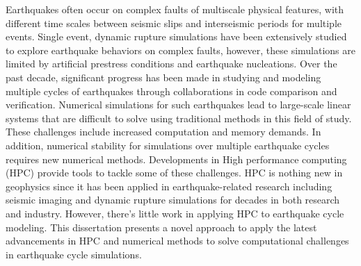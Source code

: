 Earthquakes often occur on complex faults of multiscale physical features, with different time scales between seismic slips and interseismic periods for multiple events.
Single event, dynamic rupture simulations have been extensively studied to explore earthquake behaviors on complex faults, however, these simulations are limited by artificial prestress conditions and earthquake nucleations.
Over the past decade, significant progress has been made in studying and modeling multiple cycles of earthquakes through collaborations in code comparison and verification.
Numerical simulations for such earthquakes lead to large-scale linear systems that are difficult to solve using traditional methods in this field of study.
These challenges include increased computation and memory demands.
In addition, numerical stability for simulations over multiple earthquake cycles requires new numerical methods.
Developments in High performance computing (HPC) provide tools to tackle some of these challenges.
HPC is nothing new in geophysics since it has been applied in earthquake-related research including seismic imaging and dynamic rupture simulations for decades in both research and industry.
However, there's little work in applying HPC to earthquake cycle modeling. 
This dissertation presents a novel approach to apply the latest advancements in HPC and numerical methods to solve computational challenges in earthquake cycle simulations.
